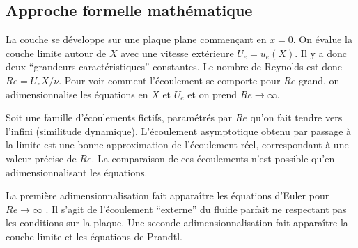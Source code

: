     \subsection{Approche formelle mathématique}
      La couche se développe sur une plaque plane commençant en $x=0$. On évalue la couche limite autour de $X$ avec une vitesse extérieure $U_e = u_e(X)$. Il y a donc deux ``grandeurs caractéristiques'' constantes. Le nombre de Reynolds est donc $Re = U_eX/\nu$. Pour voir comment l'écoulement se comporte pour $Re$ grand, on adimensionnalise les équations en $X$ et $U_e$ et on prend $Re \rightarrow \infty$.

      Soit une famille d'écoulements fictifs, paramétrés par $Re$ qu'on fait tendre vers l'infini (similitude dynamique). L'écoulement asymptotique obtenu par passage à la limite est une bonne approximation de l'écoulement réel, correspondant à une valeur précise de $Re$. La comparaison de ces écoulements n'est possible qu'en adimensionnalisant les équations.

      La première adimensionnalisation fait apparaître les équations d'Euler pour $Re \rightarrow \infty$ . Il s'agit de l'écoulement ``externe'' du fluide parfait ne respectant pas les conditions sur la plaque. Une seconde adimensionnalisation fait apparaître la couche limite et les équations de Prandtl.

